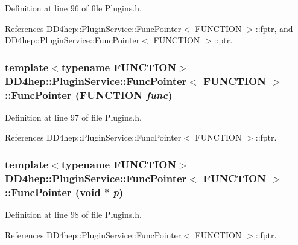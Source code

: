 Definition at line 96 of file Plugins.h.

References DD4hep::PluginService::FuncPointer$<$ FUNCTION $>$::fptr, and DD4hep::PluginService::FuncPointer$<$ FUNCTION $>$::ptr.\hypertarget{struct_d_d4hep_1_1_plugin_service_1_1_func_pointer_ae945b6d39759becb51d6d37dd05eed6e}{
\subsubsection[{FuncPointer}]{\setlength{\rightskip}{0pt plus 5cm}template$<$typename FUNCTION$>$ {\bf DD4hep::PluginService::FuncPointer}$<$ FUNCTION $>$::{\bf FuncPointer} (FUNCTION {\em func})}}
\label{struct_d_d4hep_1_1_plugin_service_1_1_func_pointer_ae945b6d39759becb51d6d37dd05eed6e}


Definition at line 97 of file Plugins.h.

References DD4hep::PluginService::FuncPointer$<$ FUNCTION $>$::fptr.\hypertarget{struct_d_d4hep_1_1_plugin_service_1_1_func_pointer_a42c98ba137676de62b6da889eeff5421}{
\subsubsection[{FuncPointer}]{\setlength{\rightskip}{0pt plus 5cm}template$<$typename FUNCTION$>$ {\bf DD4hep::PluginService::FuncPointer}$<$ FUNCTION $>$::{\bf FuncPointer} (void $\ast$ {\em p})}}
\label{struct_d_d4hep_1_1_plugin_service_1_1_func_pointer_a42c98ba137676de62b6da889eeff5421}


Definition at line 98 of file Plugins.h.

References DD4hep::PluginService::FuncPointer$<$ FUNCTION $>$::fptr.

